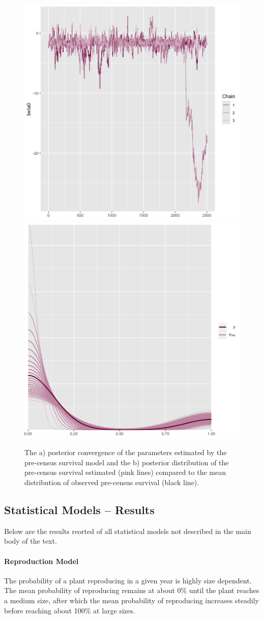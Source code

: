\documentclass[11pt]{article}
\begin{document}
\begin{figure}
	\includegraphics[width = 0.45\linewidth]{Figures/seed_surv_conv.png}
	\includegraphics[width=0.45\linewidth]{Figures/seed_surv_post.png}
	\caption{The a) posterior convergence of the parameters estimated by the pre-census survival model and the b) posterior distribution of the pre-census survival estimated (pink lines) compared to the mean distribution of observed pre-census survival (black line).}
	\label{fig:Pre_Surv_post}
\end{figure}

\subsection*{Statistical Models -- Results}
Below are the results reorted of all statistical models not described in the main body of the text. 

\paragraph{Reproduction Model}
The probability of a plant reproducing in a given year is highly size dependent. 
The mean probability of reproducing remains at about 0\% until the plant reaches a medium size, after which the mean probability of reproducing increases steadily before reaching about 100\% at large sizes. 
\end{document}
